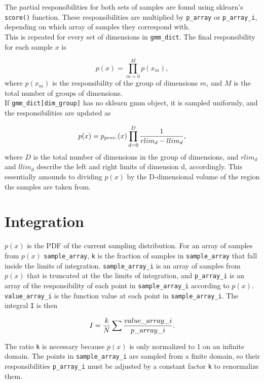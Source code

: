\documentclass{article}
\begin{document}
The partial responsibilities for both sets of samples are found using sklearn's
\texttt{score()} function. These responsibilities are multiplied by
\texttt{p\_array} or \texttt{p\_array\_i}, depending on which array of samples
they correspond with. \\

This is repeated for every set of dimensions in \texttt{gmm\_dict}. The final
responsibility for each sample $x$ is

\begin{equation}
    p(x) = \prod_{m=0}^{M} p(x_m),
\end{equation}
where $p(x_m)$ is the responsibility of the group of dimensions $m$, and $M$ is
the total number of groups of dimensions. \\

If \texttt{gmm\_dict[dim\_group]} has no sklearn gmm object, it is sampled
uniformly, and the responsibilities are updated as

\begin{equation}
    p(x) = p_{prev.}(x) \prod_{d=0}^{D} {1 \over {rlim_d - llim_d}},
\end{equation}
where $D$ is the total number of dimensions in the group of dimensions, and
$rlim_d$ and $llim_d$ describe the left and right limits of dimension d,
accordingly. This essentially amounds to dividing $p(x)$ by the D-dimensional
volume of the region the samples are taken from.

\section{Integration}

$p(x)$ is the PDF of the current sampling distribution. For an array of samples
from $p(x)$ \texttt{sample\_array}, \texttt{k} is the fraction of samples in
\texttt{sample\_array} that fall inside the limits of integration.
\texttt{sample\_array\_i} is an array of samples from $p(x)$ that is truncated
at the the limits of integration, and \texttt{p\_array\_i} is an array of the
responsibility of each point in \texttt{sample\_array\_i} according to $p(x)$.
\texttt{value\_array\_i} is the function value at each point in
\texttt{sample\_array\_i}. The integral \texttt{I} is then

\begin{equation}
    I ={ k \over N} \sum {value\_array\_i \over p\_array\_i}.
\end{equation}

The ratio \texttt{k} is necessary because $p(x)$ is only normalized to 1 on an
infinite domain. The points in \texttt{sample\_array\_i} are sampled from a
finite domain, so their responsibilities \texttt{p\_array\_i} must be adjusted
by a constant factor \texttt{k} to renormalize them.
\end{document}
